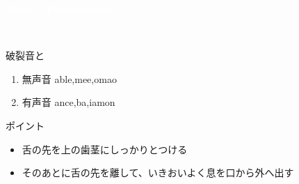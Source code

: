 \documentclass[aspectratio=169,xcolor={dvipsnames,table}]{beamer}
\begin{document}
\begin{frame}
\centering
  \textcolor{white}{\Huge\bfseries Today's Pronunciation}\pause

 \vspace{30pt}

  \textcolor{white}{\Huge\bfseries {}, }

\vfill

\hypertarget{today}{}
\end{frame}
\begin{frame}[plain]{破裂音と}

\large

\begin{enumerate}
 \item  無声音 \hspace{20pt}able,\hspace{1\zw}mee,\hspace{1\zw}omao
 \item  有声音 \hspace{18pt}ance,\hspace{1\zw}ba,\hspace{1\zw}iamon

\end{enumerate}

\vspace*{20pt}

\normalsize
ポイント

\begin{itemize}
 \item 舌の先を上の歯茎にしっかりとつける
 \item そのあとに舌の先を離して、いきおいよく息を口から外へ出す
 \end{itemize}

\hfill{}

\hypertarget{tips}{}
\hyperlink{ex}{}
\end{frame}
\end{document}

